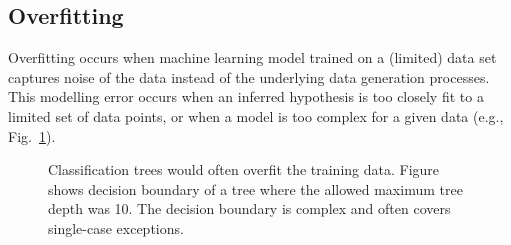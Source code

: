 \begin{refsection}
\subsection*{Overfitting}

Overfitting occurs when machine learning model trained on a (limited) data set captures noise of the data instead of the underlying data generation processes. This modelling error occurs when an inferred hypothesis is too closely fit to a limited set of data points, or when a model is too complex for a given data (e.g., Fig.~\ref{fig:tree-overfit}). 

\begin{figure}[htbp]
\label{fig:tree-overfit}
\caption{Classification trees would often overfit the training data. Figure shows decision boundary of a tree where the allowed maximum tree depth was 10. The decision boundary is complex and often covers single-case exceptions.}
\end{figure}


\end{refsection}
